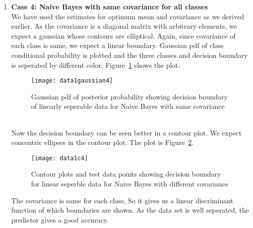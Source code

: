 \documentclass[11pt,paper=a4,answers]{exam}
\begin{document}
\begin{questions}
\begin{enumerate}[i.]
\begin{enumerate}
            \item \textbf{Case 4: Naive Bayes with same covariance for all classes}\\
            We have used the estimates for optimum mean and covariance as we derived earlier. As the covariance is a diagonal matrix with arbitrary elements, we expect a gaussian whose contours are elliptical. Again, since covariance of each class is same, we expect a linear boundary. Gaussian pdf of class conditional probability is plotted and the three classes and decision boundary is seperated by different color. Figure~\ref{fig:data1g4} shows the plot.
            \begin{figure}[ht]
                \centering
                \texttt{[image: data1gaussian4]}
                \vspace{-30pt}
                \caption{Gaussian pdf of posterior probability showing decision boundary of linearly seperable data for Naive Bayes with same covariance}
                \label{fig:data1g4}
            \end{figure}\\
            Now the decision boundary can be seen better in a contour plot. We expect concentric ellipses in the contour plot. The plot is Figure~\ref{fig:data1c4}.\\ 
            \begin{figure}[ht]
                \centering
                \texttt{[image: data1c4]}
                \vspace{-30pt}
                \caption{Contour plots and test data points showing decision boundary for linear seperble data for Naive Bayes with different covariance}
                \label{fig:data1c4}
            \end{figure}
            The covariance is same for each class, So it gives us a linear discriminant function of which boundaries are shown. As the data set is well seperated, the predictor gives a good accuracy.


\end{enumerate}
\end{enumerate}
\end{questions}
\end{document}
